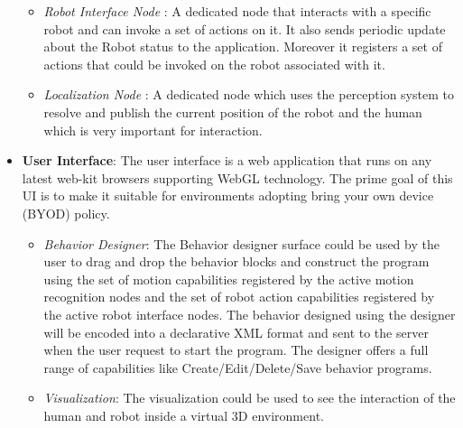 \documentclass{llncs}
\begin{document}
\begin{itemize}
\begin{itemize}
\item \emph{Robot Interface Node} : A dedicated node that interacts with a specific robot and can invoke a set of actions on it. It also sends periodic update about the Robot status to the application. Moreover it registers a set of actions that could be invoked on the robot associated with it.
\item \emph{Localization Node} : A dedicated node which uses the perception system to resolve and publish the current position of the robot and the human which is very important for interaction.
\end{itemize}
\item \textbf{User Interface}: The user interface is a web application that runs on any latest web-kit browsers supporting WebGL technology. The prime goal of this UI is to make it suitable for environments adopting bring your own device (BYOD) policy.
\begin{itemize}
\item \emph{Behavior Designer}: The Behavior designer surface could be used by the user to drag and drop the behavior blocks and construct the program using the set of motion capabilities registered by the active motion recognition nodes and the set of robot action capabilities registered by the active robot interface nodes. The behavior designed using the designer will be encoded into a declarative XML format and sent to the server when the user request to start the program. The designer offers a full range of capabilities like Create/Edit/Delete/Save behavior programs. 
\item \emph{Visualization}: The visualization could be used to see the interaction of the human and robot inside a virtual 3D environment.
\end{itemize}
\end{itemize}
\end{document}

